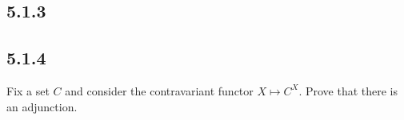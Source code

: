 \documentclass{article}
\newcommand{\mbf}{\mathbf}
\begin{document}
\subsection*{5.1.3}

\subsection*{5.1.4}

Fix a set $C$ and consider the contravariant functor $X \mapsto C^X$. Prove that there is an adjunction.

\begin{center}
\end{center}
\end{document}
